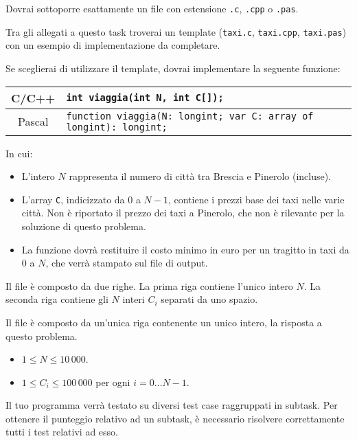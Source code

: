 \Implementation
Dovrai sottoporre esattamente un file con estensione \texttt{.c}, \texttt{.cpp} o \texttt{.pas}.

\begin{warning}
Tra gli allegati a questo task troverai un template (\texttt{taxi.c}, \texttt{taxi.cpp}, \texttt{taxi.pas}) con un esempio di implementazione da completare.
\end{warning}

Se sceglierai di utilizzare il template, dovrai implementare la seguente funzione:
\begin{center}\begin{tabularx}{\textwidth}{|c|X|}
\hline
C/C++  & \verb|int viaggia(int N, int C[]);|\\
\hline
Pascal & \verb|function viaggia(N: longint; var C: array of longint): longint;|\\
\hline
\end{tabularx}\end{center}
In cui:
\begin{itemize}[nolistsep]
  \item L'intero $N$ rappresenta il numero di città tra Brescia e Pinerolo (incluse).
  \item L'array \texttt{C}, indicizzato da $0$ a $N-1$, contiene i prezzi base dei taxi nelle varie città. Non è riportato il prezzo dei taxi a Pinerolo, che non è rilevante per la soluzione di questo problema.
  \item La funzione dovrà restituire il costo minimo in euro per un tragitto in taxi da $0$ a $N$, che verrà stampato sul file di output.
\end{itemize}

\InputFile
Il file  è composto da due righe. La prima riga contiene l'unico intero $N$. La seconda riga contiene gli $N$ interi $C_i$ separati da uno spazio.

\OutputFile
Il file \outputfile{} è composto da un'unica riga contenente un unico intero, la risposta a questo problema.

\Constraints
\begin{itemize}[nolistsep, itemsep=2mm]
	\item $1 \le N \le 10\,000$.
	\item $1 \le C_i \le 100\,000$ per ogni $i=0\ldots N-1$.
\end{itemize}

\Scoring
Il tuo programma verrà testato su diversi test case raggruppati in subtask.
Per ottenere il punteggio relativo ad un subtask, è necessario risolvere
correttamente tutti i test relativi ad esso.

